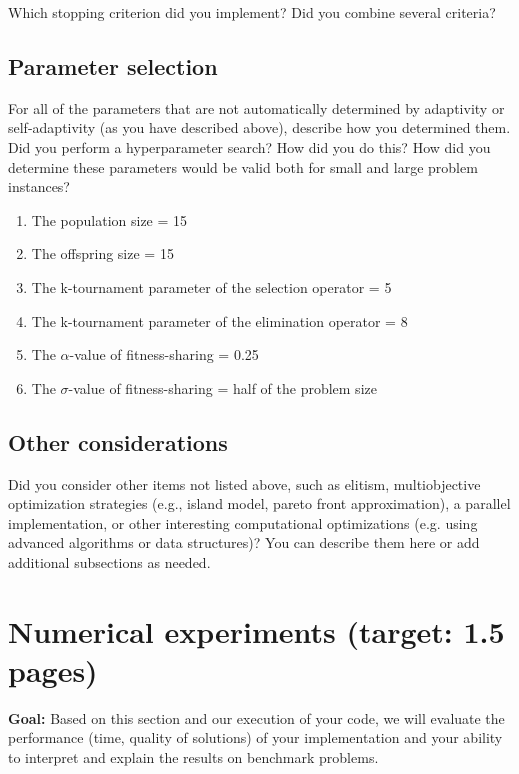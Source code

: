 \documentclass[a4paper,10pt]{article}
\newcommand{\ReplaceMe}[1]{{\color{blue}#1}}
\newcommand{\RemoveMe}[1]{{\color{purple}#1}}
\begin{document}
\ReplaceMe{Which stopping criterion did you implement? Did you combine several criteria?}

\subsection{Parameter selection}

\ReplaceMe{For all of the parameters that are not automatically determined by adaptivity or self-adaptivity (as you have described above), describe how you determined them. Did you perform a hyperparameter search? How did you do this? How did you determine these parameters would be valid both for small and large problem instances?}

\begin{enumerate}
    \item The population size = 15
    \item The offspring size = 15
    \item The k-tournament parameter of the selection operator = 5 
    \item The k-tournament parameter of the elimination operator = 8
    \item The $\alpha$-value of fitness-sharing = 0.25
    \item The $\sigma$-value of fitness-sharing = half of the problem size
\end{enumerate}

\subsection{Other considerations}


\ReplaceMe{Did you consider other items not listed above, such as elitism, multiobjective optimization strategies (e.g., island model, pareto front approximation), a parallel implementation, or other interesting computational optimizations (e.g. using advanced algorithms or data structures)? You can describe them here or add additional subsections as needed.}


\section{Numerical experiments (target: 1.5 pages)}

\RemoveMe{\textbf{Goal:} Based on this section and our execution of your code, we will evaluate the performance (time, quality of solutions) of your implementation and your ability to interpret and explain the results on benchmark problems.}
\end{document}
